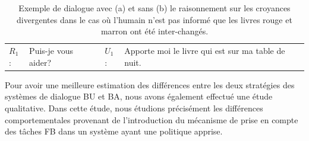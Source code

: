 \documentclass[a4paper,11pt,twoside]{StyleThese}
\begin{document}
\begin{table}
\centering
\scriptsize
  \begin{tabular}{llll}
  \hline
  $R_1$: & Puis-je vous aider? & $U_1$: & Apporte moi le livre qui est sur ma table de nuit.\\
\end{tabular}
  \vfill
  \qquad
  \caption{Exemple de dialogue avec (a) et sans (b) le raisonnement sur les croyances divergentes dans le cas où l'humain n'est pas informé que les livres rouge et marron ont été inter-changés.
  }
 \label{table:qualitative-samples}
 \end{table}

Pour avoir une meilleure estimation des différences entre les deux stratégies des systèmes de dialogue BU et BA, nous avons également effectué une étude qualitative. Dans cette étude, nous étudions précisément les différences comportementales provenant de l'introduction du mécanisme de prise en compte des tâches FB dans un système ayant une politique apprise. 
\end{document}
